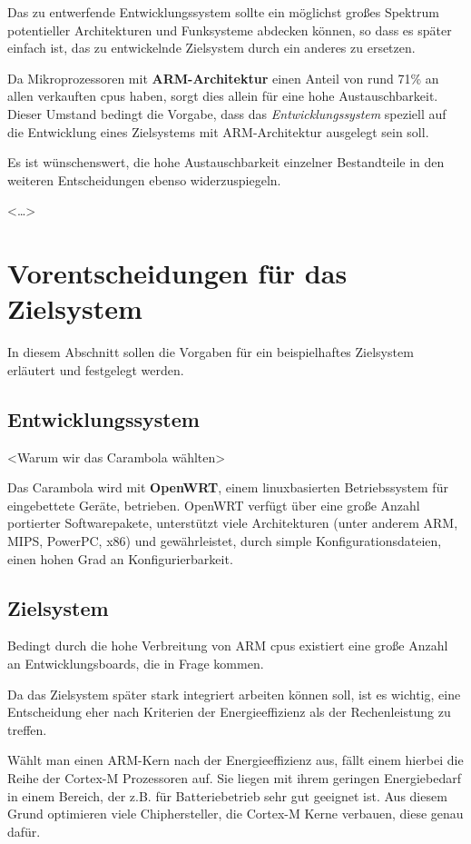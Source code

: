 Das zu entwerfende Entwicklungssystem sollte ein möglichst
großes Spektrum potentieller Architekturen und Funksysteme abdecken können, so
dass es später einfach ist, das zu entwickelnde Zielsystem durch ein anderes zu
ersetzen.

Da Mikroprozessoren mit \textbf{ARM-Architektur} einen Anteil von rund
71\%\cite{IDC01} an allen verkauften \glspl{cpu} haben, sorgt dies allein für
eine hohe Austauschbarkeit. Dieser Umstand bedingt die Vorgabe, dass das
\emph{Entwicklungssystem} speziell auf die Entwicklung eines Zielsystems
mit ARM-Architektur ausgelegt sein soll. 

Es ist wünschenswert, die hohe Austauschbarkeit einzelner Bestandteile in
den weiteren Entscheidungen ebenso widerzuspiegeln.

<\ldots>

\section{Vorentscheidungen für das  Zielsystem} In diesem Abschnitt sollen die
Vorgaben für ein beispielhaftes Zielsystem erläutert und festgelegt werden. 
\subsection{Entwicklungssystem}
<Warum wir das Carambola wählten>

Das Carambola wird mit \textbf{OpenWRT}, einem linuxbasierten Betriebssystem für
eingebettete Geräte, betrieben. OpenWRT verfügt über eine große Anzahl
portierter Softwarepakete, unterstützt viele Architekturen (unter anderem ARM,
MIPS, PowerPC, x86) und gewährleistet, durch simple Konfigurationsdateien, einen
hohen Grad an Konfigurierbarkeit.
\subsection{Zielsystem}
Bedingt durch die hohe Verbreitung von ARM \glspl{cpu}
existiert eine große Anzahl an Entwicklungsboards, die in Frage kommen.

Da das Zielsystem später stark integriert arbeiten können soll, ist es wichtig,
eine Entscheidung eher nach Kriterien der Energieeffizienz als der
Rechenleistung zu treffen.

Wählt man einen ARM-Kern nach der Energieeffizienz aus, fällt einem hierbei die
Reihe der Cortex-M Prozessoren auf. Sie liegen mit ihrem geringen Energiebedarf
in einem Bereich, der z.B. für Batteriebetrieb sehr gut geeignet ist. Aus diesem
Grund optimieren viele Chiphersteller, die Cortex-M Kerne verbauen, diese genau
dafür.

